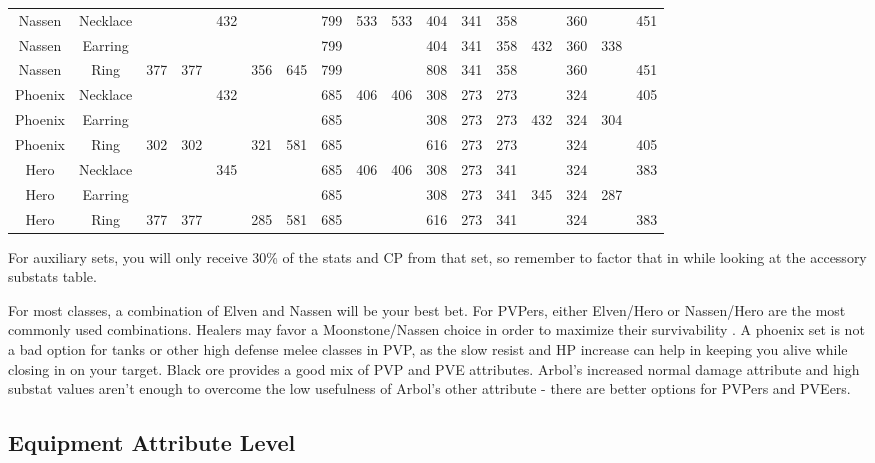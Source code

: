 \documentclass[]{article}
\begin{document}
\begin{center}
\begin{tabular}{|cc|l|l|l|l|l|l|l|l|l|l|l|l|l|l|l|}
	\hline 
	\rule[-1ex]{0pt}{2.5ex} Nassen & Necklace &  &  & 432 &  &  & 799 & 533 & 533 & 404 & 341 & 358 &  & 360 &  & 451 \\ 
	\rule[-1ex]{0pt}{2.5ex} Nassen & Earring &  &  &  &  &  & 799 &  &  & 404 & 341 & 358 & 432 & 360 & 338 &  \\ 
	\rule[-1ex]{0pt}{2.5ex} Nassen & Ring & 377 & 377 &  & 356 & 645 & 799 &  &  & 808 & 341 & 358 &  & 360 &  & 451 \\ 
	\hline 
	\rule[-1ex]{0pt}{2.5ex} Phoenix & Necklace &  &  & 432 &  &  & 685 & 406 & 406 & 308 & 273 & 273 &  & 324 &  & 405 \\ 
	\rule[-1ex]{0pt}{2.5ex} Phoenix & Earring &  &  &  &  &  & 685 &  &  & 308 & 273 & 273 & 432 & 324 & 304 &  \\ 
	\rule[-1ex]{0pt}{2.5ex} Phoenix & Ring & 302 & 302 &  & 321 & 581 & 685 &  &  & 616 & 273 & 273 &  & 324 &  & 405 \\ 
	\hline 
	\rule[-1ex]{0pt}{2.5ex} Hero & Necklace &  &  & 345 &  &  & 685 & 406 & 406 & 308 & 273 & 341 &  & 324 &  & 383 \\ 
	\rule[-1ex]{0pt}{2.5ex} Hero & Earring &  &  &  &  &  & 685 &  &  & 308 & 273 & 341 & 345 & 324 & 287 &  \\ 
	\rule[-1ex]{0pt}{2.5ex} Hero & Ring & 377 & 377 &  & 285 & 581 & 685 &  &  & 616 & 273 & 341 &  & 324 &  & 383 \\ 
	\hline 
\end{tabular} 
\end{center}

For auxiliary sets, you will only receive 30\% of the stats and CP from that set, so remember to factor that in while looking at the accessory substats table.

For most classes, a combination of Elven and Nassen will be your best bet.
For PVPers, either Elven/Hero or Nassen/Hero are the most commonly used combinations.
Healers may favor a Moonstone/Nassen choice in order to maximize their survivability .
A phoenix set is not a bad option for tanks or other high defense melee classes in PVP, as the slow resist and HP increase can help in keeping you alive while closing in on your target.
Black ore provides a good mix of PVP and PVE attributes.
Arbol's increased normal damage attribute and high substat values aren't enough to overcome the low usefulness of Arbol's other attribute - there are better options for PVPers and PVEers.

\subsection{Equipment Attribute Level}
\end{document}
